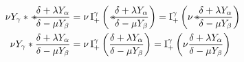 \documentclass{scrartcl}
\newcommand{ \convfrac }[ 2 ]{
    { \hspace{2pt}{\mathrlap{*}\hspace{-2pt}
        \frac{ \hphantom{*} #1 }{ \hphantom{*} #2 } }
    }
}
\begin{document}
    \begin{align}
        \nu Y_\gamma
        *
        \convfrac{ \delta + \lambda Y_\alpha }{ \delta - \mu Y_\beta }
        &=
        \nu
        \operatorname{I}^\gamma_+
        \left(
        \convfrac{ \delta + \lambda Y_\alpha }{ \delta - \mu Y_\beta }
        \right)
        =
        \operatorname{I}^\gamma_+
        \left(
        \nu
        \convfrac{ \delta + \lambda Y_\alpha }{ \delta - \mu Y_\beta }
        \right)
        \\
        \nu Y_\gamma
        *
        \frac{ \delta + \lambda Y_\alpha }{ \delta - \mu Y_\beta }
        &=
        \nu
        \operatorname{I}^\gamma_+
        \left(
        \frac{ \delta + \lambda Y_\alpha }{ \delta - \mu Y_\beta }
        \right)
        =
        \operatorname{I}^\gamma_+
        \left(
        \nu
        \frac{ \delta + \lambda Y_\alpha }{ \delta - \mu Y_\beta }
        \right)
    \end{align}
\end{document}
